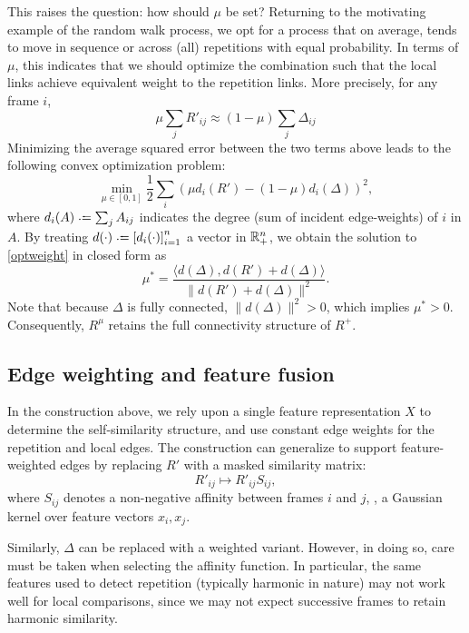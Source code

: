 \documentclass{article}
\begin{document}
This raises the question: how should $\mu$ be set?  Returning to the motivating
example of the random walk process, we opt for a process that on average, tends to
move in sequence or across (all) repetitions with equal probability.  In terms of
$\mu$, this indicates that we should optimize the combination such that the local
links achieve equivalent weight to the repetition links.  More precisely, for any 
frame $i$,
$$
\mu \sum_j R'_{ij} \approx (1-\mu) \sum_j \Delta_{ij} 
$$
Minimizing the average squared error between the two terms above leads to the
following convex optimization problem:
\begin{equation}
\min_{\mu \in [0, 1]} \frac{1}{2} \sum_i {(\mu d_i(R') - (1 - \mu)d_i(\Delta))}^2,\label{optweight}
\end{equation}
where $d_i(A) \defeq \sum_j A_{ij}$ indicates the degree (sum of incident edge-weights) 
of $i$ in $A$. By treating $d(\cdot) \defeq {[d_i(\cdot)]}_{i=1}^n$ a vector in 
$\mathbb{R}^n_+$, we obtain the solution to \cref{optweight} in closed form as
\begin{equation}
\mu^* = \frac{\langle d(\Delta), d(R') + d(\Delta)\rangle}{\|d(R') +
d(\Delta)\|^2}.\label{optweight:solution}
\end{equation}
Note that because $\Delta$ is fully connected, $\|d(\Delta)\|^2 > 0$, which implies
$\mu^* > 0$.  Consequently, $R^\mu$ retains the full connectivity structure
of $R^+$.

\subsection{Edge weighting and feature fusion}
In the construction above, we rely upon a single feature representation $X$ to 
determine the self-similarity structure, and use constant edge weights for the
repetition and local edges.  The construction can generalize to support
feature-weighted edges by replacing $R'$ with a masked similarity matrix:
\begin{equation}
R'_{ij} \mapsto R'_{ij} S_{ij},
\end{equation}
where $S_{ij}$ denotes a non-negative affinity between frames $i$ and $j$, \eg,
a Gaussian kernel over feature vectors $x_i, x_j$.

Similarly, $\Delta$ can be replaced with a weighted variant.  However, in doing so,
care must be taken when selecting the affinity function.  In particular, the same
features used to detect repetition (typically harmonic in nature) may not work well
for local comparisons, since we may not expect successive frames to retain
harmonic similarity.  
\end{document}
